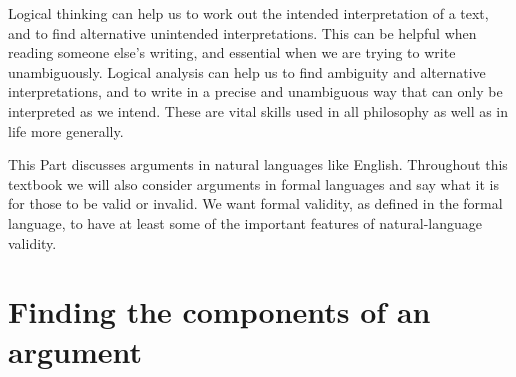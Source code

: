 Logical thinking can help us to work out the intended
interpretation of a text, and to find alternative
unintended interpretations.
This can be helpful when reading someone else’s
writing, and essential when we are trying to write
unambiguously.
Logical analysis can help us to find ambiguity and
alternative interpretations, and to write in a precise and
unambiguous way that can only be interpreted as we
intend.
These are vital skills used in all philosophy as well as in life more generally.





This Part discusses arguments in natural languages like English. Throughout this textbook we will also consider arguments in formal languages and say what it is for those to be valid or invalid. We want formal validity, as defined in the formal language, to have at least some of the important features of natural-language validity.





\section{Finding the components of an argument}



